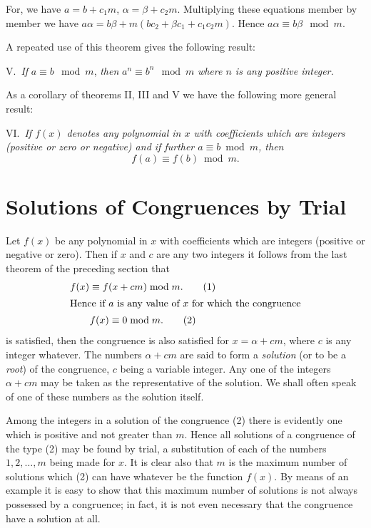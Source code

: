 \documentclass[oneside]{book}
\begin{document}
For, we have $a = b + c_1 m$, $\alpha = \beta + c_2 m$. Multiplying
these equations member by member we have $a \alpha = b \beta + m (b
c_2 + \beta c_1 + c_1 c_2 m)$. Hence $a \alpha \equiv b \beta \mod
m$.

\smallskip A repeated use of this theorem gives the following
result:

\smallskip V.~\emph{If} $a \equiv b \mod m$, \emph{then}
$a^n \equiv b^n \mod m$ \emph{where $n$ is any positive integer.}

\smallskip As a corollary of theorems II, III and V we have the
following more general result:

\smallskip VI.~\emph{If $f(x)$ denotes any polynomial in $x$ with
coefficients which are integers (positive or zero or negative) and
if further $a\equiv b \bmod m$, then}
\begin{equation*}
f(a) \equiv f(b) \bmod m.
\end{equation*}

\section{Solutions of Congruences by Trial}\label{s19}%

Let $f(x)$ be any polynomial in $x$ with coefficients which are
integers (positive or negative or zero). Then if $x$ and $c$ are any
two integers it follows from the last theorem of the preceding
section that
\begin{gather*}
f(x) \equiv f(x + cm) \bmod m. \tag{1} \\
\intertext{Hence if $a$ is any value of $x$ for which the
congruence}
f(x)\equiv 0\bmod m. \tag{2}
\end{gather*}
is satisfied, then the congruence is also satisfied for $x = \alpha
+ cm$, where $c$ is any integer whatever. The numbers $\alpha + cm$
are said to form a \emph{solution} (or to be a \emph{root}) of the
congruence, $c$ being a variable integer. Any one of the integers
$\alpha + cm$ may be taken as the representative of the solution. We
shall often speak of one of these numbers as the solution itself.

Among the integers in a solution of the congruence (2) there is
evidently one which is positive and not greater than $m$. Hence all
solutions of a congruence of the type (2) may be found by trial, a
substitution of each of the numbers $1, 2, \ldots, m$ being made for
$x$. It is clear also that $m$ is the maximum number of solutions
which (2) can have whatever be the function $f(x)$. By means of an
example it is easy to show that this maximum number of solutions is
not always possessed by a congruence; in fact, it is not even
necessary that the congruence have a solution at all.
\end{document}
